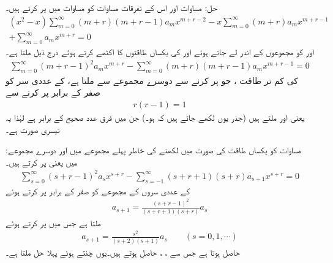 حل: مساوات  اور اس کے تفرقات مساوات  کو مساوات  میں پر کرتے ہیں۔
\begin{multline*}
(x^2-x)\sum_{m=0}^{\infty} (m+r)(m+r-1)a_mx^{m+r-2}-x\sum_{m=0}^{\infty}(m+r)a_m x^{m+r-1}\\
+\sum_{m=0}^{\infty} a_mx^{m+r}=0
\end{multline*}
  اور  کو مجموعوں کے اندر لے جاتے ہوئے اور  کی یکساں طاقتوں کا اکٹھے کرتے ہوئے درج ذیل ملتا ہے۔
\begin{align}\label{مساوات_بیسل_تیسری_صورت_الف}
\sum_{m=0}^{\infty} (m+r-1)^2a_mx^{m+r}-\sum_{m=0}^{\infty} (m+r)(m+r-1)a_mx^{m+r-1}=0
\end{align}
 کی کم تر طاقت ، جو   پر کرنے سے دوسرے مجموعے سے ملتا ہے، کے عددی سر کو صفر کے برابر پر کرنے سے
\begin{align*}
r(r-1)=1
\end{align*}
یعنی  اور  ملتے ہیں (جذر یوں لکھے جاتے ہیں کہ  ہو۔) جن میں فرق عدد صحیح کے برابر  ہے لہٰذا یہ تیسری صورت ہے۔

:مساوات  کو یکساں طاقت کی صورت میں لکھنے کی خاطر پہلے مجموعے میں  اور دوسرے مجموعے میں  یعنی  پر کرتے ہیں۔
 \begin{align}
\sum_{s=0}^{\infty} (s+r-1)^2a_sx^{s+r}-\sum_{s=-1}^{\infty} (s+r+1)(s+r)a_{s+1}x^{s+r}=0
\end{align}
 کے عددی سروں کے مجموعے کو صفر کے برابر پر کرتے ہوئے
\begin{align*}
a_{s+1}=\frac{(s+r-1)^2}{(s+r+1)(s+r)}a_s
\end{align*}
ملتا ہے جس میں  پر کرتے ہوئے 
\begin{align}
a_{s+1}=\frac{s^2}{(s+2)(s+1)}a_s\quad \quad (s=0,1,\cdots)
\end{align}
حاصل ہوتا ہے  جس سے ، ،  حاصل ہوتے ہیں۔یوں  چنتے ہوئے پہلا حل  ملتا ہے۔

